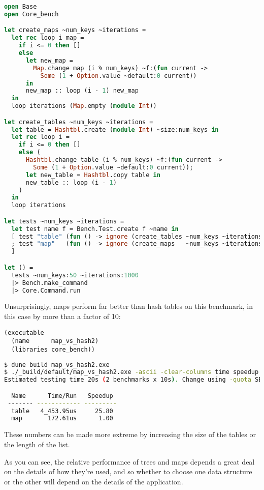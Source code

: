 \begin{lstlisting}[language=Caml]
open Base
open Core_bench

let create_maps ~num_keys ~iterations =
  let rec loop i map =
    if i <= 0 then []
    else
      let new_map =
        Map.change map (i % num_keys) ~f:(fun current ->
          Some (1 + Option.value ~default:0 current))
      in
      new_map :: loop (i - 1) new_map
  in
  loop iterations (Map.empty (module Int))

let create_tables ~num_keys ~iterations =
  let table = Hashtbl.create (module Int) ~size:num_keys in
  let rec loop i =
    if i <= 0 then []
    else (
      Hashtbl.change table (i % num_keys) ~f:(fun current ->
        Some (1 + Option.value ~default:0 current));
      let new_table = Hashtbl.copy table in
      new_table :: loop (i - 1)
    )
  in
  loop iterations

let tests ~num_keys ~iterations =
  let test name f = Bench.Test.create f ~name in
  [ test "table" (fun () -> ignore (create_tables ~num_keys ~iterations))
  ; test "map"   (fun () -> ignore (create_maps   ~num_keys ~iterations))
  ]

let () =
  tests ~num_keys:50 ~iterations:1000
  |> Bench.make_command
  |> Core.Command.run
\end{lstlisting}

Unsurprisingly, maps perform far better than hash tables on this
benchmark, in this case by more than a factor of 10:

\begin{lstlisting}
(executable
  (name      map_vs_hash2)
  (libraries core_bench))
\end{lstlisting}

\begin{lstlisting}[language=bash]
$ dune build map_vs_hash2.exe
$ ./_build/default/map_vs_hash2.exe -ascii -clear-columns time speedup
Estimated testing time 20s (2 benchmarks x 10s). Change using -quota SECS.

  Name      Time/Run   Speedup
 ------- ------------ ---------
  table   4_453.95us     25.80
  map       172.61us      1.00
\end{lstlisting}

These numbers can be made more extreme by increasing the size of the
tables or the length of the list.

As you can see, the relative performance of trees and maps depends a
great deal on the details of how they're used, and so whether to choose
one data structure or the other will depend on the details of the
application.
